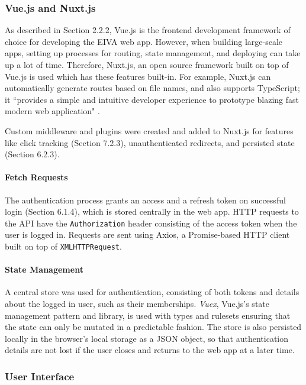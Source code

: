 \documentclass{article}
\begin{document}
\subsubsection{Vue.js and Nuxt.js}

As described in Section 2.2.2, Vue.js is the frontend development framework of choice for developing the EIVA web app. However, when building large-scale apps, setting up processes for routing, state management, and deploying can take up a lot of time. Therefore, Nuxt.js, an open source framework built on top of Vue.js is used which has these features built-in. For example, Nuxt.js can automatically generate routes based on file names, and also supports TypeScript; it ``provides a simple and intuitive developer experience to prototype blazing fast modern web application" \cite{alexchopin_announcing_nodate}.

Custom middleware and plugins were created and added to Nuxt.js for features like click tracking (Section 7.2.3), unauthenticated redirects, and persisted state (Section 6.2.3).

\paragraph{Fetch Requests}

The authentication process grants an access and a refresh token on successful login (Section 6.1.4), which is stored centrally in the web app. HTTP requests to the API have the \texttt{Authorization} header consisting of the access token when the user is logged in. Requests are sent using Axios, a Promise-based HTTP client built on top of  \texttt{XMLHTTPRequest}.

\paragraph{State Management}

A central store was used for authentication, consisting of both tokens and details about the logged in user, such as their memberships. \emph{Vuex}, Vue.js's state management pattern and library, is used with types and rulesets ensuring that the state can only be mutated in a predictable fashion. The store is also persisted locally in the browser's local storage as a JSON object, so that authentication details are not lost if the user closes and returns to the web app at a later time.

\subsubsection{User Interface}
\end{document}
